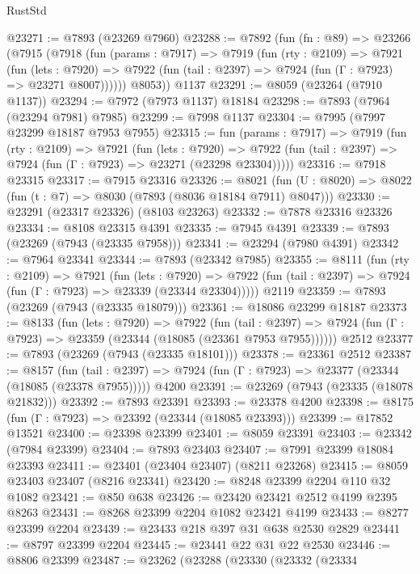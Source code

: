 \begin{lexlean}{RustStd}
\begin{coremodule}
@23271 := @7893 (@23269 @7960)
@23288 := @7892
    (fun (fn : @89) =>
    @23266
      (@7915
        (@7918
          (fun (params : @7917) =>
          @7919
            (fun (rty : @2109) =>
            @7921
              (fun (lets : @7920) =>
              @7922 (fun (tail : @2397) => @7924 (fun (Γ : @7923) => @23271 @8007))))))
        @8053))
    @1137
@23291 := @8059 (@23264 (@7910 @1137))
@23294 := @7972 (@7973 @1137) @18184
@23298 := @7893 (@7964 (@23294 @7981) @7985)
@23299 := @7998 @1137
@23304 := @7995 (@7997 @23299 @18187 @7953 @7955)
@23315 := fun (params : @7917) =>
  @7919
    (fun (rty : @2109) =>
    @7921
      (fun (lets : @7920) =>
      @7922 (fun (tail : @2397) => @7924 (fun (Γ : @7923) => @23271 (@23298 @23304)))))
@23316 := @7918 @23315
@23317 := @7915 @23316
@23326 := @8021
    (fun (U : @8020) => @8022 (fun (t : @7) => @8030 (@7893 (@8036 @18184 @7911) @8047)))
@23330 := @23291 (@23317 @23326) (@8103 @23263)
@23332 := @7878 @23316 @23326
@23334 := @8108 @23315 @4391
@23335 := @7945 @4391
@23339 := @7893 (@23269 (@7943 (@23335 @7958)))
@23341 := @23294 (@7980 @4391)
@23342 := @7964 @23341
@23344 := @7893 (@23342 @7985)
@23355 := @8111
    (fun (rty : @2109) =>
    @7921
      (fun (lets : @7920) =>
      @7922 (fun (tail : @2397) => @7924 (fun (Γ : @7923) => @23339 (@23344 @23304)))))
    @2119
@23359 := @7893 (@23269 (@7943 (@23335 @18079)))
@23361 := @18086 @23299 @18187
@23373 := @8133
    (fun (lets : @7920) =>
    @7922
      (fun (tail : @2397) =>
      @7924 (fun (Γ : @7923) => @23359 (@23344 (@18085 (@23361 @7953 @7955))))))
    @2512
@23377 := @7893 (@23269 (@7943 (@23335 @18101)))
@23378 := @23361 @2512
@23387 := @8157
    (fun (tail : @2397) => @7924 (fun (Γ : @7923) => @23377 (@23344 (@18085 (@23378 @7955)))))
    @4200
@23391 := @23269 (@7943 (@23335 (@18078 @21832)))
@23392 := @7893 @23391
@23393 := @23378 @4200
@23398 := @8175 (fun (Γ : @7923) => @23392 (@23344 (@18085 @23393)))
@23399 := @17852 @13521
@23400 := @23398 @23399
@23401 := @8059 @23391
@23403 := @23342 (@7984 @23399)
@23404 := @7893 @23403
@23407 := @7991 @23399 @18084 @23393
@23411 := @23401 (@23404 @23407) (@8211 @23268)
@23415 := @8059 @23403 @23407 (@8216 @23341)
@23420 := @8248 @23399 @2204 @110 @32 @1082
@23421 := @850 @638
@23426 := @23420 @23421 @2512 @4199 @2395 @8263
@23431 := @8268 @23399 @2204 @1082 @23421 @4199
@23433 := @8277 @23399 @2204
@23439 := @23433 @218 @397 @31 @638 @2530 @2829
@23441 := @8797 @23399 @2204
@23445 := @23441 @22 @31 @22 @2530
@23446 := @8806 @23399
@23487 := @23262
    (@23288
      (@23330
        (@23332
          (@23334

\end{coremodule}
\end{lexlean}
